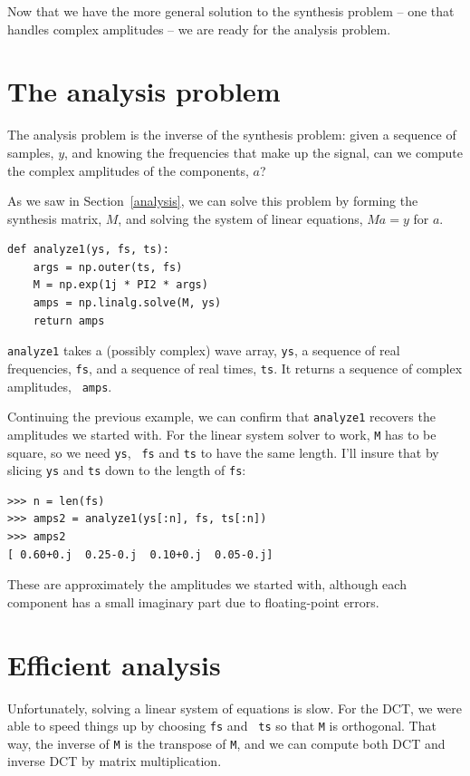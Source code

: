 \documentclass[12pt]{book}
\begin{document}
Now that we have the more general solution to the synthesis problem --
one that handles complex amplitudes -- we are ready for the analysis
problem.


\section{The analysis problem}

The analysis problem is the inverse of the synthesis problem: given a
sequence of samples, $y$, and knowing the frequencies
that make up the signal, can we compute the complex amplitudes of the
components, $a$?

As we saw in Section~\ref{analysis}, we can solve this problem by forming
the synthesis matrix, $M$, and solving the system of linear
equations, $M a = y$ for $a$.

\begin{verbatim}
def analyze1(ys, fs, ts):
    args = np.outer(ts, fs)
    M = np.exp(1j * PI2 * args)
    amps = np.linalg.solve(M, ys)
    return amps
\end{verbatim}

{\tt analyze1} takes a (possibly complex) wave array, {\tt ys}, a
sequence of real frequencies, {\tt fs}, and a sequence of real
times, {\tt ts}.  It returns a sequence of complex amplitudes, {\tt
  amps}.

Continuing the previous example, we can confirm that {\tt analyze1}
recovers the amplitudes we started with.  For the linear system
solver to work, {\tt M} has to be square, so we need {\tt ys}, {\tt
  fs} and {\tt ts} to have the same length.  I'll insure that by
slicing {\tt ys} and {\tt ts} down to the length of {\tt fs}:

\begin{verbatim}
>>> n = len(fs)
>>> amps2 = analyze1(ys[:n], fs, ts[:n])
>>> amps2
[ 0.60+0.j  0.25-0.j  0.10+0.j  0.05-0.j]
\end{verbatim}

These are approximately the amplitudes we started with, although
each component has a small imaginary part due to
floating-point errors.


\section{Efficient analysis}

Unfortunately, solving a linear system of equations is slow.  For the
DCT, we were able to speed things up by choosing {\tt fs} and {\tt
  ts} so that {\tt M} is orthogonal.  That way, the inverse of {\tt M}
is the transpose of {\tt M}, and we can compute both DCT and inverse
DCT by matrix multiplication.
\end{document}
